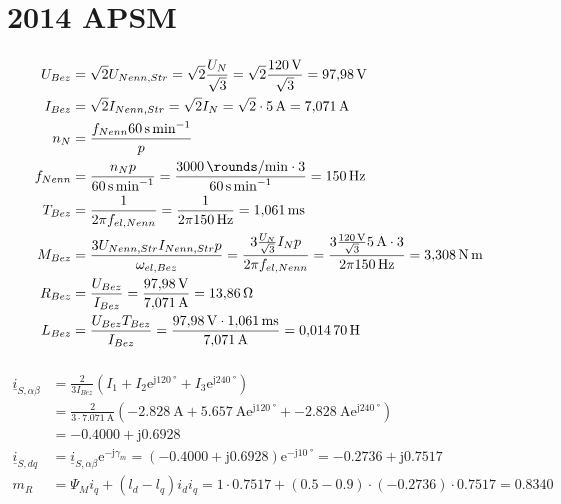 \documentclass[11pt,a4paper]{scrartcl}
\newcommand{\mybr}[1]{\left(#1\right)}
\renewcommand{\j}{\mathrm{j}}
\renewcommand{\i}{\underline{i}}
\newcommand{\0}{_{\mybr{0}}}
\newcommand{\1}{_{\mybr{1}}}
\newcommand{\2}{_{\mybr{2}}}
\renewcommand{\e}{\mathrm{e}}
\newcommand{\isab}{\i_{S,\alpha\beta}}
\newcommand{\isdq}{\i_{S,dq}}
\begin{document}
\clearpage
\part{2014 APSM}
\section{}
\begin{align}
U_{Bez}&=\sqrt{2}U_{Nenn,Str}=\sqrt{2}\frac{U_N}{\sqrt{3}}=\sqrt{2}\frac{\SI{120}{\volt}}{\sqrt{3}}=\SI{97.98}{\volt}\\
I_{Bez}&=\sqrt{2}I_{Nenn,Str}=\sqrt{2}I_N=\sqrt{2}\cdot\SI{5}{\ampere}=\SI{7.071}{\ampere}\\
n_N&=\frac{f_{Nenn}\SI{60}{\second\per\minute}}{p}\\
f_{Nenn}&=\frac{n_N p}{\SI{60}{\second\per\minute}}=\frac{\SI{3000}{\rounds\per\minute}\cdot 3}{\SI{60}{\second\per\minute}}=\SI{150}{\hertz}\\
T_{Bez}&=\frac{1}{2\pi f_{el,Nenn}}=\frac{1}{2\pi\SI{150}{\hertz}}=\SI{1.061}{\milli\second}\\
M_{Bez}&=\frac{3 U_{Nenn,Str}I_{Nenn,Str}p}{\omega_{el,Bez}}=\frac{3 \frac{U_N}{\sqrt{3}}I_{N}p}{2\pi f_{el,Nenn}}=\frac{3\frac{\SI{120}{\volt}}{\sqrt{3}}\SI{5}{\ampere}\cdot 3}{2\pi\SI{150}{\hertz}}=\SI{3.308}{\newton\metre}\\
R_{Bez}&=\frac{U_{Bez}}{I_{Bez}}=\frac{\SI{97.98}{\volt}}{\SI{7.071}{\ampere}}=\SI{13.86}{\ohm}\\
L_{Bez}&=\frac{U_{Bez}T_{Bez}}{I_{Bez}}=\frac{\SI{97.98}{\volt}\cdot\SI{1.061}{\milli\second}}{\SI{7.071}{\ampere}}=\SI{0.01470}{\henry}
\end{align}

\section{}
\begin{align}
\isab&=\frac{2}{3I_{Bez}}\mybr{I_1+I_2 \e^{\j\SI{120}{\degree}}+I_3\e^{\j\SI{240}{\degree}}}\\
&=\frac{2}{3\cdot\SI{7.071}{\ampere}}\mybr{\SI{-2.828}{\ampere}+\SI{5.657}{\ampere} \e^{\j\SI{120}{\degree}}+\SI{-2.828}{\ampere}\e^{\j\SI{240}{\degree}}}\\
&=\num{-0.4000}+\j\num{0.6928}\\
\isdq&=\isab\e^{-\j\gamma_m}=\mybr{\num{-0.4000}+\j\num{0.6928}}\e^{-\j\SI{10}{\degree}}=\num{-0.2736}+\j\num{0.7517}\\
m_R&=\Psi_M i_q +\mybr{l_d-l_q}i_d i_q = \num{1}\cdot\num{0.7517}+\mybr{\num{0.5}-\num{0.9}}\cdot\mybr{\num{-0.2736}}\cdot\num{0.7517}=\num{0.8340}
\end{align}
\end{document}
